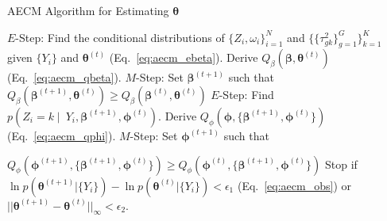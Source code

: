 \documentclass[11pt]{article}
\newcommand\spacingset[1]{\renewcommand{\baselinestretch}%
  {#1}\small\normalsize}
\begin{document}
\begin{algorithm}[!t]\spacingset{1.25}
	\caption{AECM Algorithm for Estimating $\bm{\theta}$}
	\label{alg:main}
	\begin{algorithmic}
		
		 $E$-Step: Find the conditional distributions of $\{Z_i, \omega_i\}_{i=1}^N$ and $\{\{\tau^2_{gk}\}_{g=1}^G\}_{k=1}^K$ given $\{Y_i\}$ and $\bm{\theta}^{(t)}$ (Eq.~\eqref{eq:aecm_ebeta}). Derive $Q_\beta(\bm{\beta}, \bm{\theta}^{(t)})$ (Eq.~\eqref{eq:aecm_qbeta}).
		 $M$-Step: Set $\bm{\beta}^{(t+1)}$ such that $Q_\beta(\bm{\beta}^{(t+1)}, \bm{\theta}^{(t)}) \geq Q_\beta(\bm{\beta}^{(t)}, \bm{\theta}^{(t)})$ 
		 $E$-Step: Find $p(Z_i=k\mid~Y_i, \bm{\beta}^{(t+1)}, \bm{\phi}^{(t)})$. Derive $Q_\phi(\bm{\phi}, \{\bm{\beta}^{(t+1)}, \bm{\phi}^{(t)}\})$ (Eq.~\eqref{eq:aecm_qphi}). 
		 $M$-Step: Set $\bm{\phi}^{(t+1)}$ such that 
		
		$Q_\phi(\bm{\phi}^{(t+1)}, \{\bm{\beta}^{(t+1)}, \bm{\phi}^{(t)}\}) \geq Q_\phi(\bm{\phi}^{(t)}, \{\bm{\beta}^{(t+1)}, \bm{\phi}^{(t)}\})$
		 Stop if $\ln p(\bm{\theta}^{(t+1)} | \{Y_i\}) - \ln p(\bm{\theta}^{(t)} | \{Y_i\}) < \epsilon_1$ (Eq.~\eqref{eq:aecm_obs}) or $||\bm{\theta}^{(t+1)} - \bm{\theta}^{(t)}||_\infty < \epsilon_2$.
		\EndFor
	\end{algorithmic}
\end{algorithm}
\end{document}
